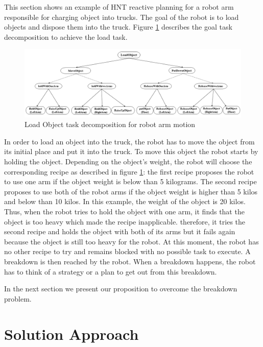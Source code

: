 \documentclass[conference]{IEEEtran}
\begin{document}
	
	\par This section shows an example of HNT reactive planning for a robot arm responsible for charging object into trucks. 
	The goal of the robot is to load objects and dispose them into the truck. Figure \ref{fig:ex} describes the goal task decomposition to achieve the load task.
	 	\begin{figure}[t]
	 		\label{fig:ex}
	 		\includegraphics[width=\textwidth]{Figures/example1}
	 		\caption{Load Object task decomposition for robot arm motion}
	 	\end{figure}
	In order to load an object into the truck, the robot has to move the object from its initial place and put it into the truck. 
	To move this object the robot starts by holding the object. Depending on the object's  weight, the robot will choose the corresponding recipe as described in figure \ref{fig:ex}: the first recipe proposes the robot to use one arm if the object weight is below than 5 kilograms. The second recipe proposes to use both of the robot arms if the object weight is higher than 5 kilos and below than 10 kilos.
	In this example, the weight of the object is 20 kilos. Thus, when the robot tries to hold the object with one arm, it finds that the object is too heavy which made the recipe inapplicable. therefore, it tries the second recipe and holds the object with both of its arms but it fails again because the object is still too heavy for the robot. At this moment, the robot has no other recipe to try and remains blocked with no possible task to execute. A breakdown is then reached by the robot. When a breakdown happens, the robot has to think of a strategy or a plan to get out from this breakdown. 
	
	\par In the next section we present our proposition to overcome the breakdown problem. 
	
	
	
	\section{Solution Approach}
	
\end{document}
